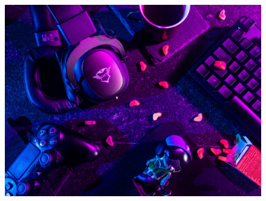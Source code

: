 	\begin{figure}[h]
		\begin{center}
			\includegraphics[width=.47\textwidth]{img/image9.jpg}
			\label{gr01}
		\end{center}
	\end{figure}

	
	
	\vfill\null
	
	\newpage %
	
	
	\vfill\null
	
	\raggedright
	


